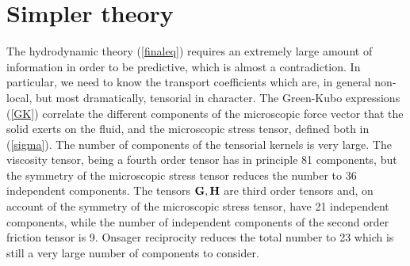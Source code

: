 \documentclass[b5paper,openright,11pt]{book}
\begin{document}

\section{Simpler theory}
The hydrodynamic theory  (\ref{finaleq}) requires
an extremely  large amount of  information in order to  be predictive,
which  is almost  a  contradiction. In particular,
we  need to  know the  transport  coefficients which  are, in  general
non-local,  but  most  dramatically,   tensorial  in  character.   The
Green-Kubo expressions  (\ref{GK}) correlate the  different components
of the  microscopic force vector that  the solid exerts on  the fluid,
and the microscopic stress tensor, defined both in (\ref{sigma}).  The
number  of components  of the  tensorial kernels  is very  large.  The
viscosity  tensor, being  a fourth  order tensor  has in  principle 81
components, but the symmetry of  the microscopic stress tensor reduces
the number  to 36 independent  components.  The tensors  ${\bf G},{\bf
  H}$ are third  order tensors and, on account of  the symmetry of the
microscopic stress  tensor, have 21 independent  components, while the
number of independent  components of the second  order friction tensor
is 9.   Onsager reciprocity reduces  the total  number to 23  which is
still a very large number of components to consider.
\end{document}
